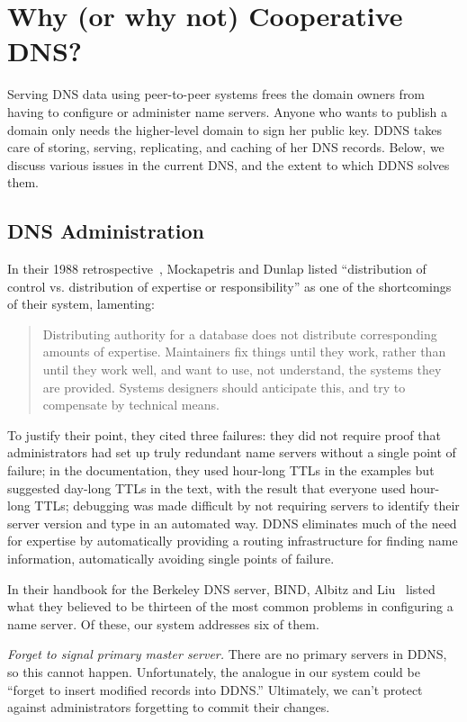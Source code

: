 \section{Why (or why not) Cooperative DNS?}

Serving DNS data using peer-to-peer systems 
frees the domain owners from having to configure
or administer name servers. Anyone who 
wants to publish a domain only needs the higher-level
domain to sign her public key. DDNS takes care of
storing, serving, replicating, and caching of her DNS records.
Below, we discuss various issues in the current DNS, 
and the extent to which DDNS solves them.

\subsection{DNS Administration}

In their 1988 retrospective~\cite{dns}, Mockapetris and Dunlap
listed ``distribution of control vs. distribution of expertise
or responsibility'' as one of the shortcomings of their system,
lamenting:
\begin{quote}
Distributing authority for a database does not distribute
corresponding amounts of expertise.  Maintainers fix things
until they work, rather than until they work well, and want to use,
not understand, the systems they are provided.
Systems designers should anticipate this, and try to
compensate by technical means.
\end{quote}
To justify their point, they cited three failures:
they did not require proof that administrators had set up
truly redundant name servers without a single point of failure;
in the documentation, they used hour-long TTLs 
in the examples but suggested
day-long TTLs in the text, with the result that everyone used
hour-long TTLs; debugging was made difficult by not requiring
servers to identify their server version and type in an automated way.
DDNS eliminates much of the need for expertise by 
automatically providing a routing infrastructure for finding 
name information, automatically avoiding single points of 
failure.

In their handbook for the Berkeley DNS server, BIND,
Albitz and Liu~\cite{dns-bind} listed what they believed to be
thirteen of the most common problems in configuring
a name server.
Of these, our system addresses six of them.

{\em Forget to signal primary master server.}
There are no primary servers in DDNS, so this cannot happen.
Unfortunately, the analogue in our system could be ``forget to
insert modified records into DDNS.''
Ultimately, we can't protect against administrators
forgetting to commit their changes.

